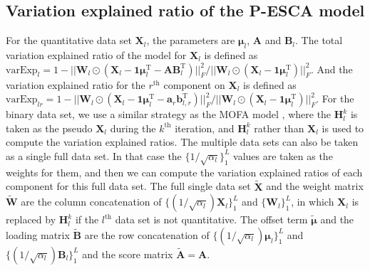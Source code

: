 \subsection{Variation explained ratio of the P-ESCA model}
For the quantitative data set $\mathbf{X}_l$, the parameters are $\bm{\mu}_l$, $\mathbf{A}$ and $\mathbf{B}_l$. The total variation explained ratio of the model for $\mathbf{X}_l$ is defined as $\text{varExp}_{l} = 1 - ||\mathbf{W}_l \odot (\mathbf{X}_l - \mathbf{1} \bm{\mu}_l^{\text{T}} - \mathbf{AB}_l^{\text{T}})||_F^2/||\mathbf{W}_l \odot (\mathbf{X}_l - \mathbf{1}\bm{\mu}_l^{\text{T}})||_F^2$. And the variation explained ratio for the $r^{\text{th}}$ component on $\mathbf{X}_l$ is defined as $\text{varExp}_{lr} = 1 - ||\mathbf{W}_l \odot (\mathbf{X}_l - \mathbf{1}\bm{\mu}_l^{\text{T}} - \mathbf{a}_r \mathbf{b}_{l,r}^{\text{T}})||_F^2/||\mathbf{W}_l \odot (\mathbf{X}_l - \mathbf{1}\bm{\mu}_l^{\text{T}})||_F^2$. For the binary data set, we use a similar strategy as the MOFA model \cite{argelaguet2018multi}, where the $\mathbf{H}_{l}^k$ is taken as the pseudo $\mathbf{X}_l$ during the $k^{\text{th}}$ iteration, and $\mathbf{H}_{l}^k$ rather than $\mathbf{X}_l$ is used to compute the variation explained ratios. The multiple data sets can also be taken as a single full data set. In that case the $\{1/\sqrt{\alpha_l} \}_{1}^{L}$ values are taken as the weights for them, and then we can compute the variation explained ratios of each component for this full data set. The full single data set $\widetilde{\mathbf{X}}$ and the weight matrix $\widetilde{\mathbf{W}}$ are the column concatenation of $\{(1/\sqrt{\alpha_l}) \mathbf{X}_l \}_{1}^{L}$ and $\{ \mathbf{W}_l \}_{1}^{L}$, in which $\mathbf{X}_l$ is replaced by $\mathbf{H}^{k}_l$ if the $l^{\text{th}}$ data set is not quantitative. The offset term $\widetilde{\bm{\mu}}$ and the loading matrix $\widetilde{\mathbf{B}}$ are the row concatenation of $\{ (1/\sqrt{\alpha_l}) \bm{\mu}_l \}_{1}^{L}$ and $\{ (1/\sqrt{\alpha_l}) \mathbf{B}_l \}_{1}^{L}$ and the score matrix $\widetilde{\mathbf{A}} = \mathbf{A}$.

